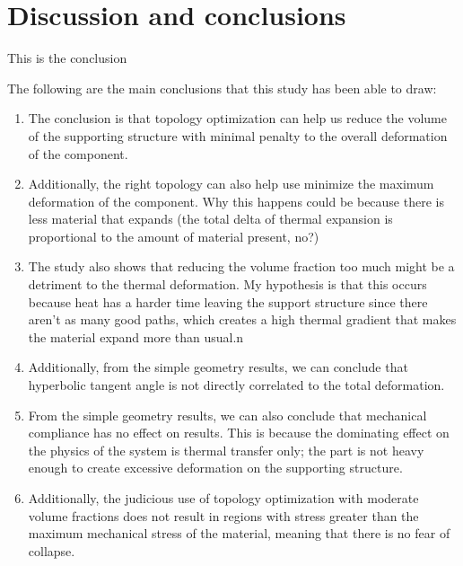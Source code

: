 \documentclass[../main.tex]{subfiles}
\begin{document}
\chapter{Discussion and conclusions}


This is the conclusion

The following are the main conclusions that this study has been able to draw:
\begin{enumerate}

  \item The conclusion is that topology optimization can help us reduce the volume of the supporting structure with minimal penalty to the overall deformation of the component. 
  \item Additionally, the right topology can also help use minimize the maximum deformation of the component. Why this happens could be because there is less material that expands (the total delta of thermal expansion is proportional to the amount of material present, no?)
  \item The study also shows that reducing the volume fraction too much might be a detriment to the thermal deformation. My hypothesis is that this occurs because heat has a harder time leaving the support structure since there aren’t as many good paths, which creates a high thermal gradient that makes the material expand more than usual.n
  \item Additionally, from the simple geometry results, we can conclude that hyperbolic tangent angle is not directly correlated to the total deformation.
  \item From the simple geometry results, we can also conclude that mechanical compliance has no effect on results. This is because the dominating effect on the physics of the system is thermal transfer only; the part is not heavy enough to create excessive deformation on the supporting structure.
  \item Additionally, the judicious use of topology optimization with moderate volume fractions does not result in regions with stress greater than the maximum mechanical stress of the material, meaning that there is no fear of collapse.

\end{enumerate}
\end{document}
